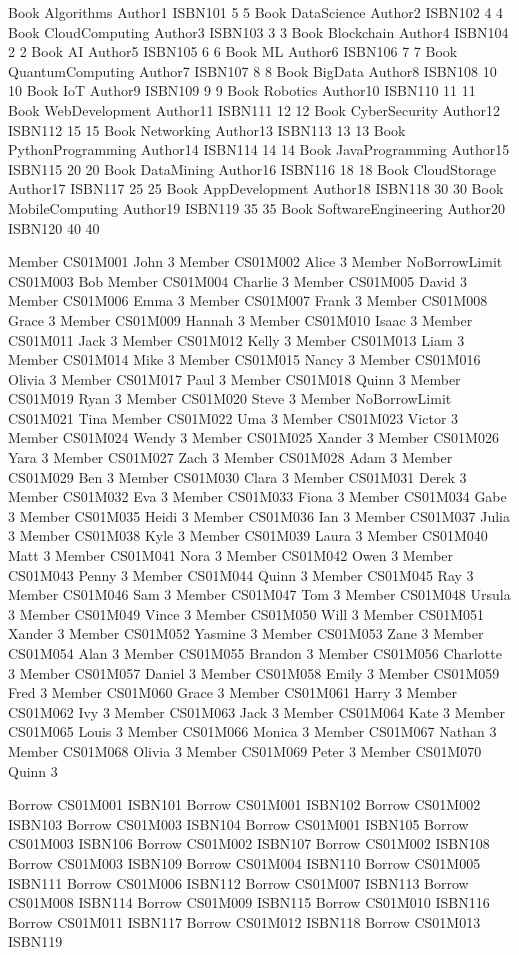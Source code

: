 
Book
Algorithms Author1 ISBN101 5 5
Book
DataScience Author2 ISBN102 4 4
Book
CloudComputing Author3 ISBN103 3 3
Book
Blockchain Author4 ISBN104 2 2
Book
AI Author5 ISBN105 6 6
Book
ML Author6 ISBN106 7 7
Book
QuantumComputing Author7 ISBN107 8 8
Book
BigData Author8 ISBN108 10 10
Book
IoT Author9 ISBN109 9 9
Book
Robotics Author10 ISBN110 11 11
Book
WebDevelopment Author11 ISBN111 12 12
Book
CyberSecurity Author12 ISBN112 15 15
Book
Networking Author13 ISBN113 13 13
Book
PythonProgramming Author14 ISBN114 14 14
Book
JavaProgramming Author15 ISBN115 20 20
Book
DataMining Author16 ISBN116 18 18
Book
CloudStorage Author17 ISBN117 25 25
Book
AppDevelopment Author18 ISBN118 30 30
Book
MobileComputing Author19 ISBN119 35 35
Book
SoftwareEngineering Author20 ISBN120 40 40

Member
CS01M001 John 3
Member
CS01M002 Alice 3
Member
NoBorrowLimit CS01M003 Bob
Member
CS01M004 Charlie 3
Member
CS01M005 David 3
Member
CS01M006 Emma 3
Member
CS01M007 Frank 3
Member
CS01M008 Grace 3
Member
CS01M009 Hannah 3
Member
CS01M010 Isaac 3
Member
CS01M011 Jack 3
Member
CS01M012 Kelly 3
Member
CS01M013 Liam 3
Member
CS01M014 Mike 3
Member
CS01M015 Nancy 3
Member
CS01M016 Olivia 3
Member
CS01M017 Paul 3
Member
CS01M018 Quinn 3
Member
CS01M019 Ryan 3
Member
CS01M020 Steve 3
Member
NoBorrowLimit CS01M021 Tina
Member
CS01M022 Uma 3
Member
CS01M023 Victor 3
Member
CS01M024 Wendy 3
Member
CS01M025 Xander 3
Member
CS01M026 Yara 3
Member
CS01M027 Zach 3
Member
CS01M028 Adam 3
Member
CS01M029 Ben 3
Member
CS01M030 Clara 3
Member
CS01M031 Derek 3
Member
CS01M032 Eva 3
Member
CS01M033 Fiona 3
Member
CS01M034 Gabe 3
Member
CS01M035 Heidi 3
Member
CS01M036 Ian 3
Member
CS01M037 Julia 3
Member
CS01M038 Kyle 3
Member
CS01M039 Laura 3
Member
CS01M040 Matt 3
Member
CS01M041 Nora 3
Member
CS01M042 Owen 3
Member
CS01M043 Penny 3
Member
CS01M044 Quinn 3
Member
CS01M045 Ray 3
Member
CS01M046 Sam 3
Member
CS01M047 Tom 3
Member
CS01M048 Ursula 3
Member
CS01M049 Vince 3
Member
CS01M050 Will 3
Member
CS01M051 Xander 3
Member
CS01M052 Yasmine 3
Member
CS01M053 Zane 3
Member
CS01M054 Alan 3
Member
CS01M055 Brandon 3
Member
CS01M056 Charlotte 3
Member
CS01M057 Daniel 3
Member
CS01M058 Emily 3
Member
CS01M059 Fred 3
Member
CS01M060 Grace 3
Member
CS01M061 Harry 3
Member
CS01M062 Ivy 3
Member
CS01M063 Jack 3
Member
CS01M064 Kate 3
Member
CS01M065 Louis 3
Member
CS01M066 Monica 3
Member
CS01M067 Nathan 3
Member
CS01M068 Olivia 3
Member
CS01M069 Peter 3
Member
CS01M070 Quinn 3

Borrow
CS01M001 ISBN101
Borrow
CS01M001 ISBN102
Borrow
CS01M002 ISBN103
Borrow
CS01M003 ISBN104
Borrow
CS01M001 ISBN105
Borrow
CS01M003 ISBN106
Borrow
CS01M002 ISBN107
Borrow
CS01M002 ISBN108
Borrow
CS01M003 ISBN109
Borrow
CS01M004 ISBN110
Borrow
CS01M005 ISBN111
Borrow
CS01M006 ISBN112
Borrow
CS01M007 ISBN113
Borrow
CS01M008 ISBN114
Borrow
CS01M009 ISBN115
Borrow
CS01M010 ISBN116
Borrow
CS01M011 ISBN117
Borrow
CS01M012 ISBN118
Borrow
CS01M013 ISBN119

